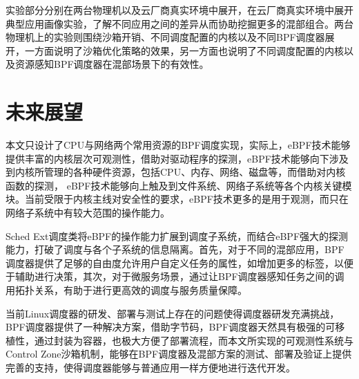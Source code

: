 实验部分分别在两台物理机以及云厂商真实环境中展开，在云厂商真实环境中展开典型应用画像实验，了解不同应用之间的差异从而协助挖掘更多的混部组合。两台物理机上的实验则围绕沙箱开销、不同调度配置的内核以及不同BPF调度器展开，一方面说明了沙箱优化策略的效果，另一方面也说明了不同调度配置的内核以及资源感知BPF调度器在混部场景下的有效性。

\section{未来展望}

本文只设计了CPU与网络两个常用资源的BPF调度实现，实际上，eBPF技术能够提供丰富的内核层次可观测性，借助对驱动程序的探测，eBPF技术能够向下涉及到内核所管理的各种硬件资源，包括CPU、内存、网络、磁盘等，而借助对内核函数的探测， eBPF技术能够向上触及到文件系统、网络子系统等各个内核关键模块。当前受限于内核主线对安全性的要求，eBPF技术更多的是用于观测，而只在网络子系统中有较大范围的操作能力。

Sched Ext调度类将eBPF的操作能力扩展到调度子系统，而结合eBPF强大的探测能力，打破了调度与各个子系统的信息隔离。首先，对于不同的混部应用，BPF调度器提供了足够的自由度允许用户自定义任务的属性，如增加更多的标签，以便于辅助进行决策，其次，对于微服务场景，通过让BPF调度器感知任务之间的调用拓扑关系，有助于进行更高效的调度与服务质量保障。

当前Linux调度器的研发、部署与测试上存在的问题使得调度器研发充满挑战，BPF调度器提供了一种解决方案，借助字节码，BPF调度器天然具有极强的可移植性，通过封装为容器，也极大方便了部署流程，而本文所实现的可观测性系统与Control Zone沙箱机制，能够在BPF调度器及混部方案的测试、部署及验证上提供完善的支持，使得调度器能够与普通应用一样方便地进行迭代开发。